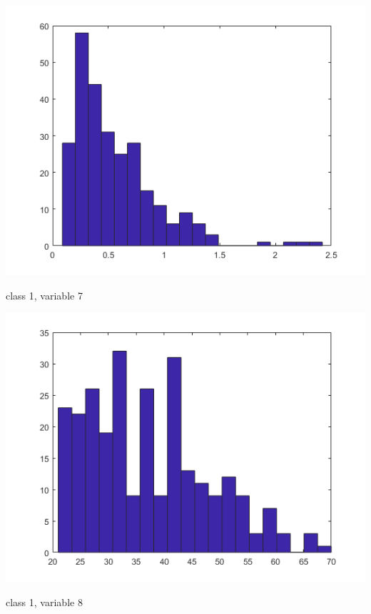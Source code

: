 \documentclass[a4paper]{article}
\begin{document}
\begin{center}
    \includegraphics[scale=1]{1-7.png}
    \caption{class 1, variable 7}
\end{center}

\begin{center}
    \includegraphics[scale=1]{1-8.png}
    \caption{class 1, variable 8}
\end{center}
\end{document}
